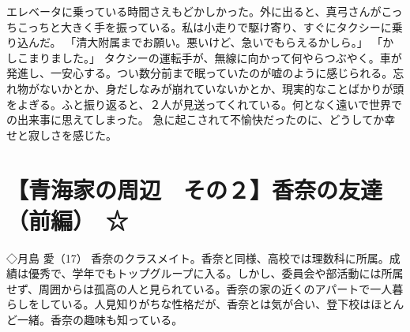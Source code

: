 エレベータに乗っている時間さえもどかしかった。外に出ると、真弓さんがこっちこっちと大きく手を振っている。私は小走りで駆け寄り、すぐにタクシーに乗り込んだ。
「清大附属までお願い。悪いけど、急いでもらえるかしら。」
「かしこまりました。」
タクシーの運転手が、無線に向かって何やらつぶやく。車が発進し、一安心する。つい数分前まで眠っていたのが嘘のように感じられる。忘れ物がないかとか、身だしなみが崩れていないかとか、現実的なことばかりが頭をよぎる。ふと振り返ると、２人が見送ってくれている。何となく遠いで世界での出来事に思えてしまった。
急に起こされて不愉快だったのに、どうしてか幸せと寂しさを感じた。


\section{【青海家の周辺　その２】香奈の友達（前編）　☆}

◇月島 愛（17）
香奈のクラスメイト。香奈と同様、高校では理数科に所属。成績は優秀で、学年でもトップグループに入る。しかし、委員会や部活動には所属せず、周囲からは孤高の人と見られている。香奈の家の近くのアパートで一人暮らしをしている。人見知りがちな性格だが、香奈とは気が合い、登下校はほとんど一緒。香奈の趣味も知っている。

